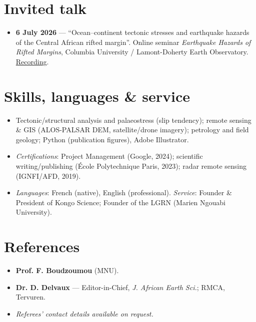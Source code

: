 \documentclass[10.5pt,a4paper]{article}
\begin{document}
\section{Invited talk}
\begin{itemize}
\item \textbf{6 July 2026} — ``Ocean--continent tectonic stresses and earthquake hazards of the Central African rifted margin''. Online seminar \emph{Earthquake Hazards of Rifted Margins}, Columbia University / Lamont-Doherty Earth Observatory. \href{https://www.youtube.com/watch?v=lnRf0Jz0QbM}{Recording}.
\end{itemize}

\section{Skills, languages \& service}
\begin{itemize}
\item Tectonic/structural analysis and palaeostress (slip tendency); remote sensing \& GIS (ALOS-PALSAR DEM, satellite/drone imagery); petrology and field geology; Python (publication figures), Adobe Illustrator.
\item \textit{Certifications}: Project Management (Google, 2024); scientific writing/publishing (École Polytechnique Paris, 2023); radar remote sensing (IGNFI/AFD, 2019).
\item \textit{Languages}: French (native), English (professional). \quad \textit{Service}: Founder \& President of Kongo Science; Founder of the LGRN (Marien Ngouabi University).
\end{itemize}

\section{References}
\begin{itemize}
\item \textbf{Prof. F. Boudzoumou} (MNU).
\item \textbf{Dr. D. Delvaux} — Editor-in-Chief, \emph{J. African Earth Sci.}; RMCA, Tervuren.
\item \textit{Referees' contact details available on request.}
\end{itemize}
\end{document}
